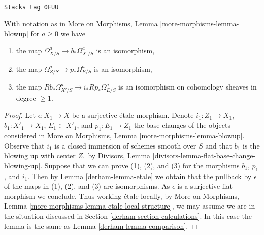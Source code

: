 \begin{lemma}
\label{derham-lemma-comparison-general}
\href{https://stacks.math.columbia.edu/tag/0FUU}{\texttt{Stacks tag 0FUU}}

With notation as in More on Morphisms, Lemma \ref{more-morphisms-lemma-blowup}
for $a \geq 0$ we have
\begin{enumerate}
\item the map
$\Omega^a_{X/S} \to b_*\Omega^a_{X'/S}$ is an isomorphism,
\item the map $\Omega^a_{Z/S} \to p_*\Omega^a_{E/S}$ is an isomorphism,
\item the map $Rb_*\Omega^a_{X'/S} \to i_*Rp_*\Omega^a_{E/S}$ is an isomorphism
on cohomology sheaves in degree $\geq 1$.
\end{enumerate}
\end{lemma}

\begin{proof}

Let $\epsilon : X_1 \to X$ be a surjective \'etale morphism. Denote
$i_1 : Z_1 \to X_1$, $b_1 : X'_1 \to X_1$, $E_1 \subset X'_1$, and
$p_1 : E_1 \to Z_1$ the base changes of the objects considered in
More on Morphisms, Lemma \ref{more-morphisms-lemma-blowup}.
Observe that $i_1$ is a closed immersion
of schemes smooth over $S$ and that $b_1$ is the blowing up with center
$Z_1$ by Divisors, Lemma \ref{divisors-lemma-flat-base-change-blowing-up}.
Suppose that we can prove (1), (2), and (3)
for the morphisms $b_1$, $p_1$, and $i_1$. Then by
Lemma \ref{derham-lemma-etale} we obtain that the pullback by $\epsilon$
of the maps in (1), (2), and (3) are isomorphisms. As $\epsilon$
is a surjective flat morphism we conclude.
Thus working \'etale locally, by
More on Morphisms, Lemma \ref{more-morphisms-lemma-etale-local-structure},
we may assume we are in the situation discussed in
Section \ref{derham-section-calculations}. In this case the lemma
is the same as Lemma \ref{derham-lemma-comparison}.
\end{proof}

